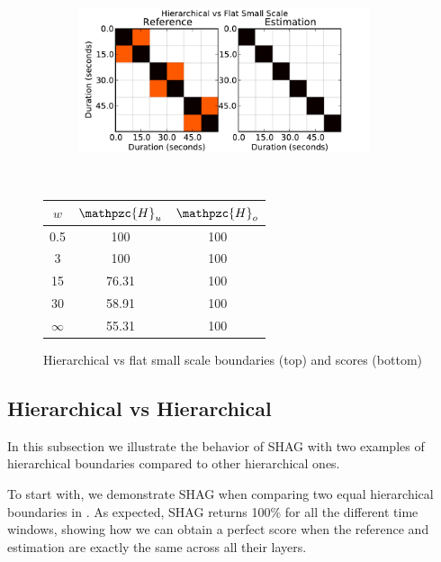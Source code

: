 \documentclass{article}
\def\shag{\ensuremath{\mathpzc{H}}}
\begin{document}
\begin{figure}[t]
  \centering
  \begin{subfigure}{0.5\textwidth}
    \centering
    \includegraphics[width=0.94\textwidth]{plots/hier-flatsmall.pdf}
  \end{subfigure}%
  \\
  \begin{minipage}{0.5\textwidth}
    \centering
    \vspace{10pt}
    \begin{tabular}{|c|c|c|}
      \hline
      $w$       & $\shag_u$    & $\shag_o$      \\
      \hline
      0.5       & 100       & 100      \\     
      3         & 100       & 100      \\
      15        & 76.31     & 100    \\
      30        & 58.91     & 100    \\
      $\infty$  & 55.31     & 100    \\
      \hline
    \end{tabular}
  \end{minipage}
  \caption{Hierarchical vs flat small scale boundaries (top) and scores (bottom)}
  \label{fig:hier-flatsmall}
\end{figure}

\subsection{Hierarchical vs Hierarchical}

In this subsection we illustrate the behavior of SHAG with two examples of hierarchical boundaries compared to other hierarchical ones.

To start with, we demonstrate SHAG when comparing two equal hierarchical boundaries in .
As expected, SHAG returns 100\% for all the different time windows, showing how we can obtain a perfect score when the reference and 
estimation are exactly the same across all their layers.
\end{document}
